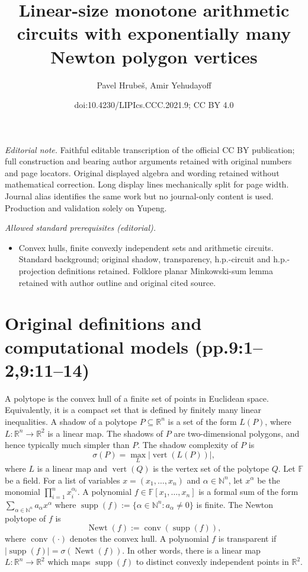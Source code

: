 \documentclass[10pt,a4paper]{article}
\title{Linear-size monotone arithmetic circuits with exponentially many Newton polygon vertices}
\author{Pavel Hrubeš, Amir Yehudayoff}
\date{doi:10.4230/LIPIcs.CCC.2021.9; CC BY 4.0}
\newcommand{\supp}{\operatorname{supp}}
\newcommand{\Newt}{\operatorname{Newt}}
\newcommand{\conv}{\operatorname{conv}}
\newcommand{\vertset}{\operatorname{vert}}
\begin{document}
\maketitle
\noindent\textit{Editorial note.} Faithful editable transcription of the official CC BY publication; full construction and bearing author arguments retained with original numbers and page locators. Original displayed algebra and wording retained without mathematical correction. Long display lines mechanically split for page width. Journal alias identifies the same work but no journal-only content is used. Production and validation solely on Yupeng.\par\medskip
\noindent\textit{Allowed standard prerequisites (editorial).}\begin{itemize}
\item Convex hulls, finite convexly independent sets and arithmetic circuits. Standard background; original shadow, transparency, h.p.-circuit and h.p.-projection definitions retained. Folklore planar Minkowski-sum lemma retained with author outline and original cited source.
\end{itemize}\medskip
\section*{Original definitions and computational models (pp.9:1--2,9:11--14)}
A polytope is the convex hull of a finite set of points in Euclidean space. Equivalently, it is a compact set that is defined by finitely many linear inequalities.
A shadow of a polytope $P\subseteq\mathbb R^n$ is a set of the form $L(P)$, where $L:\mathbb R^n\to\mathbb R^2$ is a linear map. The shadows of $P$ are two-dimensional polygons, and hence typically much simpler than $P$. The shadow complexity of $P$ is
\[
\sigma(P)=\max_L |\vertset(L(P))|,
\]
where $L$ is a linear map and $\vertset(Q)$ is the vertex set of the polytope $Q$.
Let $\mathbb F$ be a field. For a list of variables $x=(x_1,\ldots,x_n)$ and $\alpha\in\mathbb N^n$, let $x^\alpha$ be the monomial $\prod_{i=1}^n x_i^{\alpha_i}$. A polynomial $f\in\mathbb F[x_1,\ldots,x_n]$ is a formal sum of the form $\sum_{\alpha\in\mathbb N^n}a_\alpha x^\alpha$ where $\supp(f):=\{\alpha\in\mathbb N^n:a_\alpha\ne0\}$ is finite. The Newton polytope of $f$ is
\[\Newt(f):=\conv(\supp(f)),\]
where $\conv(\cdot)$ denotes the convex hull.
A polynomial $f$ is transparent if $|\supp(f)|=\sigma(\Newt(f))$. In other words, there is a linear map $L:\mathbb R^n\to\mathbb R^2$ which maps $\supp(f)$ to distinct convexly independent points in $\mathbb R^2$.
\end{document}
